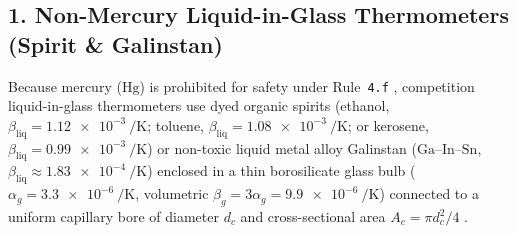 \subsection{1. Non-Mercury Liquid-in-Glass Thermometers (Spirit \& Galinstan)}
Because mercury ($\mathrm{Hg}$) is prohibited for safety under Rule~\texttt{4.f} , competition liquid-in-glass thermometers use dyed organic spirits (ethanol, $\beta_{\mathrm{liq}} = \SI{1.12e-3}{\per\kelvin}$; toluene, $\beta_{\mathrm{liq}} = \SI{1.08e-3}{\per\kelvin}$; or kerosene, $\beta_{\mathrm{liq}} = \SI{0.99e-3}{\per\kelvin}$) or non-toxic liquid metal alloy Galinstan ($\mathrm{Ga\text{--}In\text{--}Sn}$, $\beta_{\mathrm{liq}} \approx \SI{1.83e-4}{\per\kelvin}$) enclosed in a thin borosilicate glass bulb ($\alpha_g = \SI{3.3e-6}{\per\kelvin}$, volumetric $\beta_g = 3\alpha_g = \SI{9.9e-6}{\per\kelvin}$) connected to a uniform capillary bore of diameter $d_c$ and cross-sectional area $A_c = \pi d_c^2/4$ .
